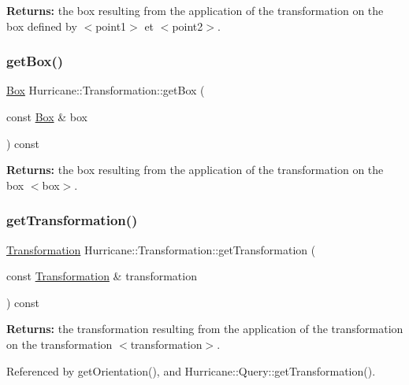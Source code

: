 {\bfseries Returns\+:} the box resulting from the application of the transformation on the box defined by {\ttfamily $<$point1$>$} et {\ttfamily $<$point2$>$}. \mbox{\label{classHurricane_1_1Transformation_a051ddd67572c50b3b8edf75f790006e2}} 
\subsubsection{\texorpdfstring{get\+Box()}{getBox()}\hspace{0.1cm}{\footnotesize\ttfamily [3/3]}}
{\footnotesize\ttfamily \hyperlink{classHurricane_1_1Box}{Box} Hurricane\+::\+Transformation\+::get\+Box (\begin{DoxyParamCaption}\item[{const \hyperlink{classHurricane_1_1Box}{Box} \&}]{box }\end{DoxyParamCaption}) const}

{\bfseries Returns\+:} the box resulting from the application of the transformation on the box {\ttfamily $<$box$>$}. \mbox{\label{classHurricane_1_1Transformation_a12ba0cbe9154661e704ce0f2638f860f}} 
\subsubsection{\texorpdfstring{get\+Transformation()}{getTransformation()}}
{\footnotesize\ttfamily \hyperlink{classHurricane_1_1Transformation}{Transformation} Hurricane\+::\+Transformation\+::get\+Transformation (\begin{DoxyParamCaption}\item[{const \hyperlink{classHurricane_1_1Transformation}{Transformation} \&}]{transformation }\end{DoxyParamCaption}) const}

{\bfseries Returns\+:} the transformation resulting from the application of the transformation on the transformation {\ttfamily $<$transformation$>$}. 

Referenced by get\+Orientation(), and Hurricane\+::\+Query\+::get\+Transformation().

